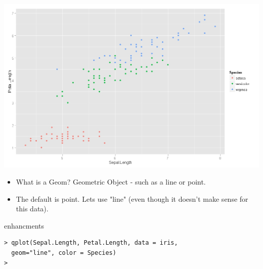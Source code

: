 \begin{frame}{\bf {}}
\vspace{-1cm}
\begin{center}
\includegraphics[scale = 0.35]{IrisPlot1}
\end{center}
\end{frame}
\begin{frame}{\bf {}}
\begin{itemize}\itemsep0.37cm
\item What is a Geom? Geometric Object - such as a line or point.
\item The default is point. Lets use "line" (even though it doesn't make sense for this data).
\end{itemize}
\end{frame}
\begin{frame}[fragile]{\bf {}}
enhancments
\begin{verbatim}
> qplot(Sepal.Length, Petal.Length, data = iris,
  geom="line", color = Species)
>
\end{verbatim}
\end{frame}
